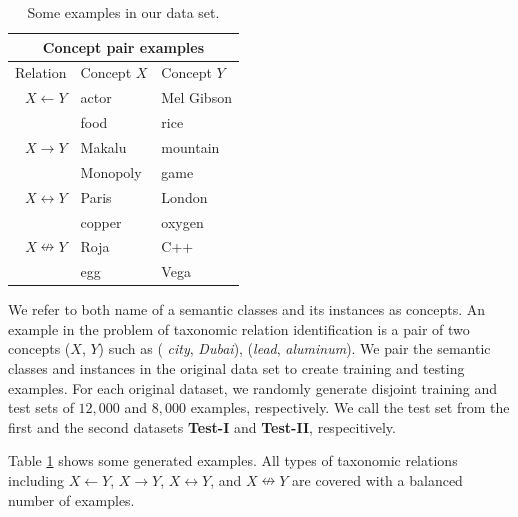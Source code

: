 \begin{table}[!t]
  \small
  \centering
  \begin{tabular}{|r|l|l|}
    \hline
    \multicolumn{3}{|c|}{Concept pair examples} \\
    \hline
    Relation          & Concept $X$ & Concept $Y$    \\
    \hline
    \hline
    $X \leftarrow Y$        & actor             & Mel Gibson           \\
    & food              & rice                 \\
    \hline                               
    $X \rightarrow Y$       & Makalu            & mountain             \\
    & Monopoly          & game                 \\
    \hline                               
    $X \leftrightarrow Y$   & Paris             & London               \\
    & copper            & oxygen                \\
    \hline                               
    $X \nleftrightarrow Y$ & Roja              & C++                  \\
    & egg               & Vega                  \\
    \hline
  \end{tabular}
  \caption{Some examples in our data set.}
  \label{table:examples}
\end{table}


We refer to both name of a semantic classes and its instances as
concepts. An example in the problem of taxonomic relation
identification is a pair of two concepts ($X$, $Y$) such as ({\em
  city}, {\em Dubai}), ({\em lead}, {\em aluminum}). We pair the
semantic classes and instances in the original data set to create
training and testing examples. For each original dataset, we randomly
generate disjoint training and test sets of $12,000$ and $8,000$
examples, respectively. We call the test set from the first and the
second datasets {\bf Test-I} and {\bf Test-II},
respecitively.  Table
\ref{table:examples} shows some generated examples. All types of
taxonomic relations including $X \leftarrow Y$, $X \rightarrow Y$, $X
\leftrightarrow Y$, and $X \nleftrightarrow Y$ are covered with a
balanced number of examples.

